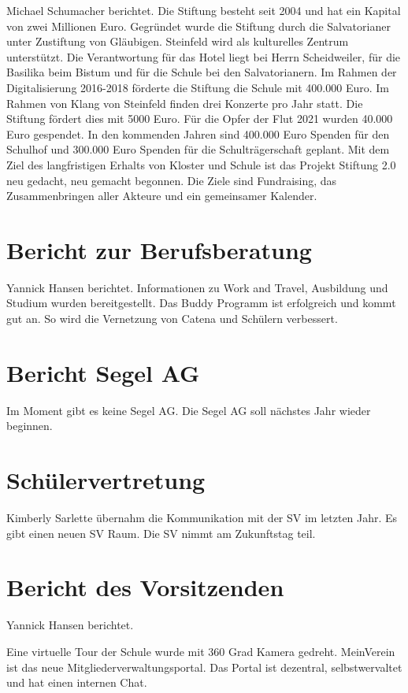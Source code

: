 \documentclass[a4paper, 11pt]{article}
\begin{document}
Michael Schumacher berichtet.
Die Stiftung besteht seit 2004 und hat ein Kapital von zwei Millionen Euro.
Gegründet wurde die Stiftung durch die Salvatorianer unter Zustiftung von Gläubigen.
Steinfeld wird als kulturelles Zentrum unterstützt.
Die Verantwortung für das Hotel liegt bei Herrn Scheidweiler, für die Basilika beim Bistum und für die Schule bei den Salvatorianern.
Im Rahmen der Digitalisierung 2016-2018 förderte die Stiftung die Schule mit 400.000 Euro.
Im Rahmen von Klang von Steinfeld finden drei Konzerte pro Jahr statt. Die Stiftung fördert dies mit 5000 Euro.
Für die Opfer der Flut 2021 wurden 40.000 Euro gespendet.
In den kommenden Jahren sind 400.000 Euro Spenden für den Schulhof und 300.000 Euro Spenden für die Schulträgerschaft geplant.
Mit dem Ziel des langfristigen Erhalts von Kloster und Schule ist das Projekt Stiftung 2.0 neu gedacht, neu gemacht begonnen.
Die Ziele sind Fundraising, das Zusammenbringen aller Akteure und ein gemeinsamer Kalender.

\section*{Bericht zur Berufsberatung}

Yannick Hansen berichtet.
Informationen zu Work and Travel, Ausbildung und Studium wurden bereitgestellt.
Das Buddy Programm ist erfolgreich und kommt gut an.
So wird die Vernetzung von Catena und Schülern verbessert.

\section*{Bericht Segel AG}

Im Moment gibt es keine Segel AG.
Die Segel AG soll nächstes Jahr wieder beginnen.


\section*{Schülervertretung}

Kimberly Sarlette übernahm die Kommunikation mit der SV im letzten Jahr.
Es gibt einen neuen SV Raum.
Die SV nimmt am Zukunftstag teil.


\section*{Bericht des Vorsitzenden}


Yannick Hansen berichtet.

Eine virtuelle Tour der Schule wurde mit 360 Grad Kamera gedreht.
MeinVerein ist das neue Mitgliederverwaltungsportal.
Das Portal ist dezentral, selbstwervaltet und hat einen internen Chat.
\end{document}
